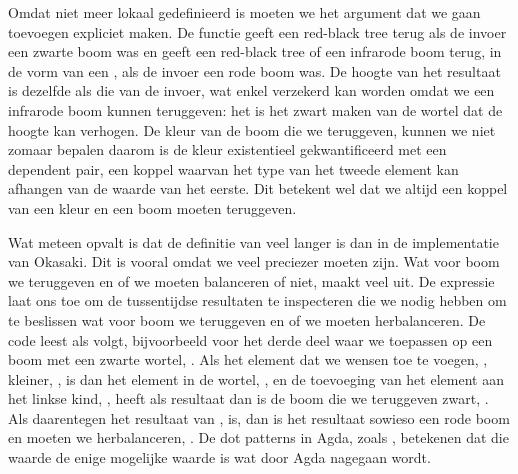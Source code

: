 Omdat  niet meer lokaal gedefinieerd is moeten we het argument dat
we gaan toevoegen expliciet maken. De functie  geeft een red-black
tree terug als de invoer een zwarte boom was en geeft een red-black tree of een
infrarode boom terug, in de vorm van een , als de invoer een
rode boom was. De hoogte van het resultaat is dezelfde als die van de invoer,
wat enkel verzekerd kan worden omdat we een infrarode boom kunnen teruggeven:
het is het zwart maken van de wortel dat de hoogte kan verhogen. De kleur van
de boom die we teruggeven, kunnen we niet zomaar bepalen daarom is de kleur
existentieel gekwantificeerd met een dependent pair, een koppel waarvan het
type van het tweede element kan afhangen van de waarde van het eerste. Dit
betekent wel dat we altijd een koppel van een kleur en een boom moeten
teruggeven.


Wat meteen opvalt is dat de definitie van  veel langer is dan in de
implementatie van Okasaki. Dit is vooral omdat we veel preciezer moeten zijn.
Wat voor boom we teruggeven en of we moeten balanceren of niet, maakt veel uit.
De  expressie laat ons toe om de tussentijdse resultaten te
inspecteren die we nodig hebben om te beslissen wat voor boom we teruggeven en
of we moeten herbalanceren. De code leest als volgt, bijvoorbeeld voor het
derde deel waar we  toepassen op een boom met een zwarte wortel,
. Als het element dat we wensen toe te voegen, ,
kleiner, , is dan het element in de wortel, , en de
toevoeging van het element aan het linkse kind, , heeft als
resultaat  dan is de boom die we teruggeven zwart, . Als daarentegen het resultaat van , 
is, dan is het resultaat sowieso een rode boom en moeten we herbalanceren,
. De dot patterns in Agda, zoals ,
betekenen dat die waarde de enige mogelijke waarde is wat door Agda nagegaan
wordt.

